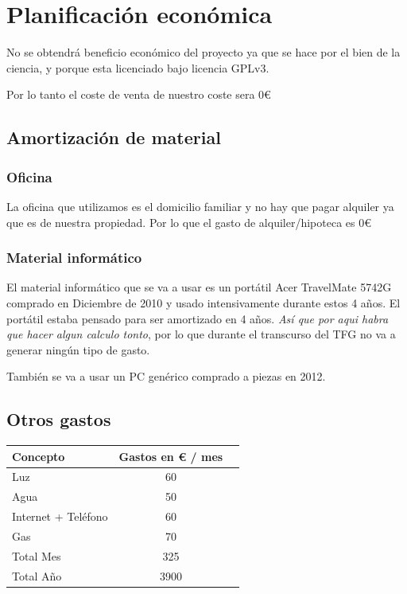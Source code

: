\section{Planificaci\'{o}n econ\'{o}mica}
No se obtendr\'{a} beneficio econ\'{o}mico del proyecto ya que se hace por el bien de la ciencia, y porque esta licenciado
bajo licencia GPLv3.

Por lo tanto el coste de venta de nuestro coste sera 0€

\subsection{Amortizaci\'{o}n de material}
\subsubsection{Oficina}
La oficina que utilizamos es el domicilio familiar y no hay que pagar alquiler ya que es de nuestra propiedad. Por lo que el gasto de alquiler/hipoteca es 0€
\subsubsection{Material inform\'{a}tico}
El material informático que se va a usar es un portátil Acer TravelMate 5742G comprado en 
Diciembre de 2010 y usado intensivamente durante estos 4 años. 
El portátil estaba pensado para ser amortizado en 4 años. \emph{As\'{i} que por aqui habra que hacer algun calculo tonto}, por lo que durante el 
transcurso del TFG no va a generar ning\'{u}n tipo de gasto.

Tambi\'{e}n se va a usar un PC gen\'{e}rico comprado a piezas en 2012.

\subsection{Otros gastos}

\begin{tabular}{l*{1}{c}r}
    Concepto                   & Gastos en € / mes & \\
    \hline
    Luz                        & 60 & \\
    Agua                       & 50 & \\
    Internet + Teléfono        & 60 & \\
    Gas                        & 70 & \\
    \hline
    Total Mes                  & 325 & \\
    Total A\~{n}o              & 3900 &\\
\end{tabular}

